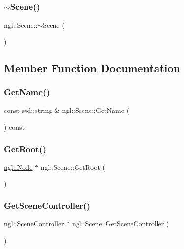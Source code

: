 \subsubsection{\texorpdfstring{$\sim$\+Scene()}{~Scene()}}
{\footnotesize\ttfamily ngl\+::\+Scene\+::$\sim$\+Scene (\begin{DoxyParamCaption}{ }\end{DoxyParamCaption})\hspace{0.3cm}{\ttfamily [virtual]}}



\subsection{Member Function Documentation}
\mbox{\label{classngl_1_1_scene_aca6dc0f87f6695de06a078c5b9d000f4}} 
\subsubsection{\texorpdfstring{Get\+Name()}{GetName()}}
{\footnotesize\ttfamily const std\+::string \& ngl\+::\+Scene\+::\+Get\+Name (\begin{DoxyParamCaption}{ }\end{DoxyParamCaption}) const}

\mbox{\label{classngl_1_1_scene_aae5f39561afdc14da42b0bc0ebf2f270}} 
\subsubsection{\texorpdfstring{Get\+Root()}{GetRoot()}}
{\footnotesize\ttfamily \mbox{\hyperlink{classngl_1_1_node}{ngl\+::\+Node}} $\ast$ ngl\+::\+Scene\+::\+Get\+Root (\begin{DoxyParamCaption}{ }\end{DoxyParamCaption})}

\mbox{\label{classngl_1_1_scene_a652f638c45d60ef09e0df0ab33fdf851}} 
\subsubsection{\texorpdfstring{Get\+Scene\+Controller()}{GetSceneController()}}
{\footnotesize\ttfamily \mbox{\hyperlink{classngl_1_1_scene_controller}{ngl\+::\+Scene\+Controller}} $\ast$ ngl\+::\+Scene\+::\+Get\+Scene\+Controller (\begin{DoxyParamCaption}{ }\end{DoxyParamCaption})}

